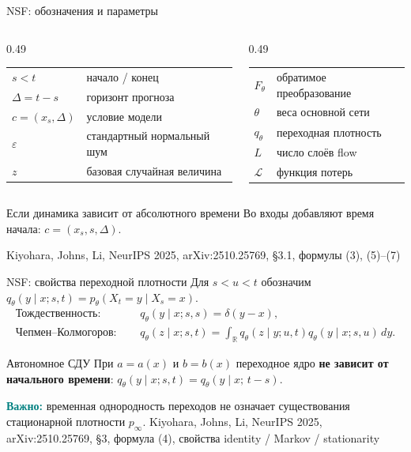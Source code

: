 \documentclass[10pt,aspectratio=169]{beamer}
\newcommand{\nsfsrc}[1]{\vfill{\tiny\color{graytext}Kiyohara, Johns, Li, NeurIPS 2025, arXiv:2510.25769, #1}}
\begin{document}
\begin{frame}{NSF: обозначения и параметры}
\vspace{0.03cm}
{\small
\begin{columns}[T,onlytextwidth]
\begin{column}{0.49\textwidth}
\begin{tabular}{@{}p{2.15cm}p{3.95cm}@{}}
$s<t$ & начало / конец \\[0.07cm]
$\Delta=t-s$ & горизонт прогноза \\[0.07cm]
$c=(x_s,\Delta)$ & условие модели \\[0.07cm]
$\varepsilon$ & стандартный нормальный шум \\[0.07cm]
$z$ & базовая случайная величина
\end{tabular}
\end{column}
\begin{column}{0.49\textwidth}
\begin{tabular}{@{}p{1.65cm}p{4.45cm}@{}}
$F_\theta$ & обратимое преобразование \\[0.07cm]
$\theta$ & веса основной сети \\[0.07cm]
$q_\theta$ & переходная плотность \\[0.07cm]
$L$ & число слоёв flow \\[0.07cm]
$\mathcal L$ & функция потерь
\end{tabular}
\end{column}
\end{columns}}
\vspace{0.13cm}
\begin{block}{Если динамика зависит от абсолютного времени}
Во входы добавляют время начала: $c=(x_s,s,\Delta)$.
\end{block}
\nsfsrc{\S 3.1, формулы (3), (5)--(7)}
\end{frame}

\begin{frame}{NSF: свойства переходной плотности}
\vspace{0.06cm}
Для $s<u<t$ обозначим $q_\theta(y\mid x;s,t)=p_\theta(X_t=y\mid X_s=x)$.
\vspace{0.17cm}
\begin{align*}
\text{Тождественность: }&\quad q_\theta(y\mid x;s,s)=\delta(y-x),\\[0.13cm]
\text{Чепмен--Колмогоров: }&\quad
q_\theta(z\mid x;s,t)=\int_{\mathbb R}q_\theta(z\mid y;u,t)
q_\theta(y\mid x;s,u)\,dy.
\end{align*}
\vspace{0.02cm}
\begin{block}{Автономное СДУ}
При $a=a(x)$ и $b=b(x)$ переходное ядро \textbf{не зависит от начального времени}: $q_\theta(y\mid x;s,t)=q_\theta(y\mid x;\,t-s)$.
\end{block}
\vspace{0.08cm}
\small \textcolor{teal}{\bfseries Важно:} временная однородность переходов не означает существования стационарной плотности $p_\infty$.
\nsfsrc{\S 3, формула (4), свойства identity / Markov / stationarity}
\end{frame}
\end{document}
